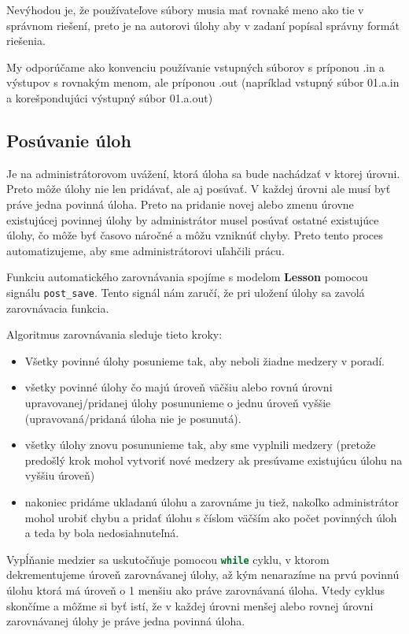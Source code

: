 Nevýhodou je, že používateľove súbory musia mať rovnaké meno ako tie v správnom riešení,
preto je na autorovi úlohy aby v zadaní popísal správny formát riešenia.

My odporúčame ako konvenciu používanie vstupných súborov s príponou .in a výstupov
s rovnakým menom, ale príponou .out (napríklad vstupný súbor 01.a.in a korešpondujúci výstupný súbor 01.a.out)

\subsection{Posúvanie úloh}
\label{implementacia:posuvanie}
Je na administrátorovom uvážení, ktorá úloha sa bude nachádzať v ktorej úrovni.
Preto môže úlohy nie len pridávať, ale aj posúvať. V každej úrovni ale musí
byť práve jedna povinná úloha. Preto na pridanie novej alebo zmenu úrovne existujúcej
povinnej úlohy by administrátor musel posúvať ostatné existujúce úlohy,
čo môže byť časovo náročné a môžu vzniknúť chyby. Preto tento proces automatizujeme,
aby sme administrátorovi uľahčili prácu.

Funkciu automatického zarovnávania
spojíme s modelom \textbf{Lesson} pomocou signálu \lstinline[language=Python]{post_save}.
Tento signál nám zaručí, že pri uložení úlohy sa zavolá zarovnávacia funkcia.

Algoritmus zarovnávania sleduje tieto kroky:
\begin{itemize}
\item Všetky povinné úlohy posunieme tak, aby neboli žiadne medzery v poradí.
\item všetky povinné úlohy čo majú úroveň väčšiu alebo rovnú úrovni upravovanej/pridanej
 úlohy posununieme o jednu úroveň vyššie (upravovaná/pridaná úloha nie je posunutá).
\item všetky úlohy znovu posununieme tak, aby sme vyplnili medzery (pretože predošlý krok mohol
    vytvoriť nové medzery ak presúvame existujúcu úlohu na vyššiu úroveň)
\item nakoniec pridáme ukladanú úlohu a zarovnáme ju tiež, nakoľko administrátor mohol urobiť chybu a pridať úlohu
    s číslom väčším ako počet povinných úloh a teda by bola nedosiahnuteľná.
\end{itemize}

Vypĺňanie medzier sa uskutočňuje pomocou \lstinline[language=Python]{while} cyklu,
v ktorom dekrementujeme úroveň zarovnávanej úlohy, až kým nenarazíme na prvú povinnú úlohu ktorá má
úroveň o 1 menšiu ako práve zarovnávaná úloha. Vtedy cyklus skončíme a môžme si byť istí,
že v každej úrovni menšej alebo rovnej úrovni zarovnávanej úlohy je práve jedna povinná úloha.

